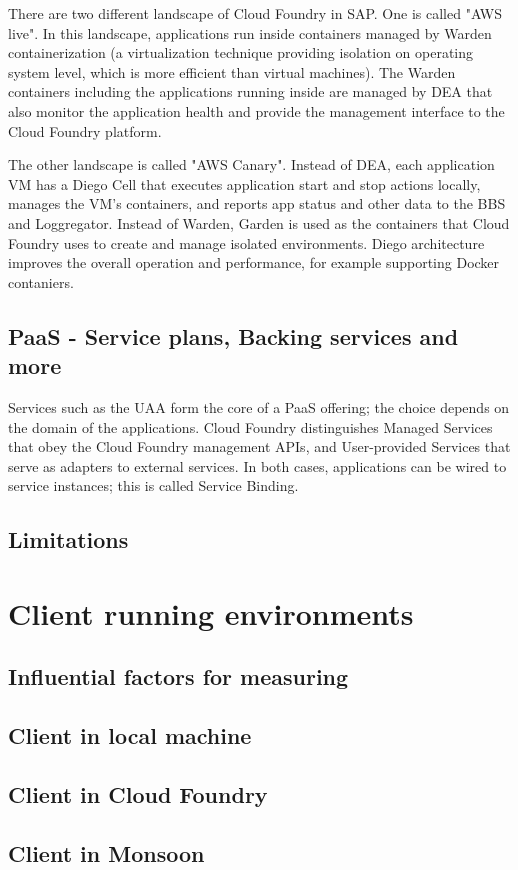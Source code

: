 There are two different landscape of Cloud Foundry in SAP. One is called "AWS live". In this landscape, applications run inside containers managed by Warden containerization (a virtualization technique providing isolation on operating system level, which is more efficient than virtual machines). The Warden containers including the applications running inside are managed by \ac{DEA} that also monitor the application health and provide the management interface to the Cloud Foundry platform.

The other landscape is called "AWS Canary". Instead of \ac{DEA}, each application VM has a Diego Cell that executes application start and stop actions locally, manages the VM’s containers, and reports app status and other data to the BBS and Loggregator. Instead of Warden, Garden is used as the containers that Cloud Foundry uses to create and manage isolated environments. Diego architecture improves the overall operation and performance, for example supporting Docker contaniers.

\subsection{PaaS - Service plans, Backing services and more}
Services such as the UAA form the core of a PaaS offering; the choice depends on the domain of the applications. Cloud Foundry distinguishes Managed Services that obey the Cloud Foundry management APIs, and User-provided Services that serve as adapters to external services. In both cases, applications can be wired to service instances; this is called Service Binding.

\subsection{Limitations}
\section{ Client running environments}
\subsection{Influential factors for measuring}
\subsection{Client in local machine}
\subsection{Client in Cloud Foundry}
\subsection{Client in Monsoon}


